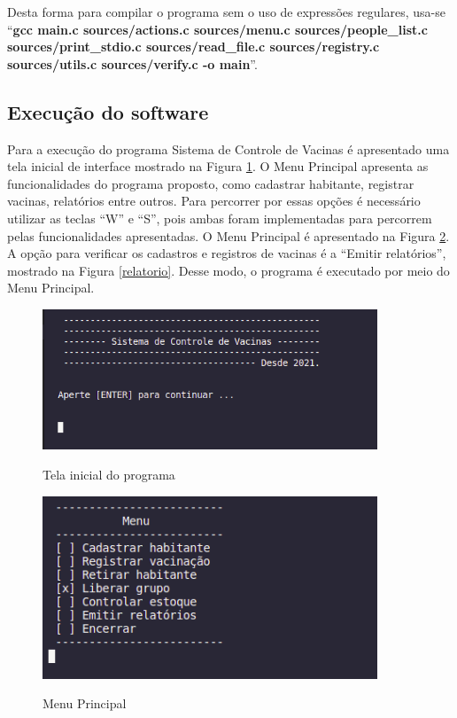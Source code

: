 \documentclass[12pt, a4paper]{article}
\begin{document}
Desta forma para compilar o programa sem o uso de expressões regulares, usa-se ``\textbf{gcc main.c sources/actions.c sources/menu.c sources/people\_list.c sources/print\_stdio.c sources/read\_file.c sources/registry.c sources/utils.c sources/verify.c -o main}''.

\subsection{Execução do software}\label{Execução do software}
Para a execução do programa Sistema de Controle de Vacinas é apresentado uma tela inicial de interface mostrado na Figura \ref{telainicial}. O Menu Principal apresenta as funcionalidades do programa proposto, como cadastrar habitante, registrar vacinas, relatórios entre outros. Para percorrer por essas opções é necessário utilizar as teclas ``W'' e ``S'', pois ambas foram implementadas para percorrem pelas funcionalidades apresentadas. O Menu Principal é apresentado na Figura \ref{menu}. A opção para verificar os cadastros e registros de vacinas é a ``Emitir relatórios'', mostrado na Figura \ref{relatorio}. Desse modo, o programa é executado por meio do Menu Principal.

\cleardoublepage
\begin{figure}[h]
	\caption{Tela inicial do programa}
	
	\centering %
	\includegraphics[width=10cm]{telaInicial.png} %
	\label{telainicial}
\end{figure}

\begin{figure}[h]
	\caption{Menu Principal}
	
	\centering %
	\includegraphics[width=10cm]{opcoes.png} %
	\label{menu}
\end{figure}
\end{document}
